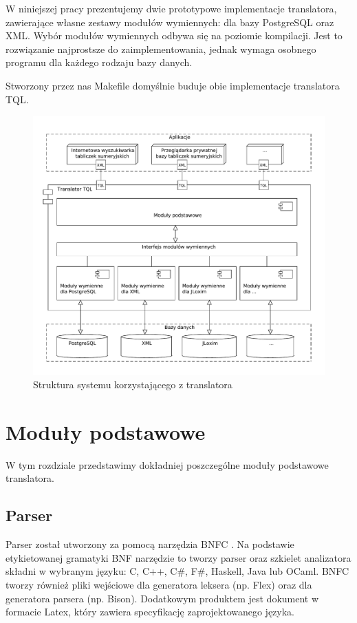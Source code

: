  W niniejszej pracy prezentujemy dwie prototypowe implementacje translatora, zawierające własne zestawy modułów wymiennych: 
dla bazy PostgreSQL oraz XML.
Wybór modułów wymiennych odbywa się na poziomie kompilacji. Jest to rozwiązanie najprostsze do zaimplementowania,
jednak wymaga osobnego programu dla każdego rodzaju bazy danych.

 Stworzony przez nas Makefile domyślnie buduje obie implementacje translatora TQL.

\begin{figure}[h]
 \centering
 \includegraphics[width=450px,bb=0 0 608 517]{../diagramy/struktura2.pdf}
 \caption{Struktura systemu korzystającego z translatora}
 \label{struktura_systemu}
\end{figure}

\section{Moduły podstawowe}

W tym rozdziale przedstawimy dokładniej poszczególne moduły podstawowe translatora.

\subsection{Parser}
Parser został utworzony za pomocą narzędzia BNFC \cite{bnfc}. Na podstawie etykietowanej gramatyki BNF 
narzędzie to tworzy parser oraz szkielet analizatora składni w wybranym języku: C, C++, C\#, F\#, Haskell, Java lub OCaml. 
BNFC tworzy również pliki wejściowe dla generatora leksera (np. Flex) oraz dla generatora parsera (np. Bison). 
Dodatkowym produktem jest dokument w formacie Latex, który zawiera specyfikację zaprojektowanego języka.


